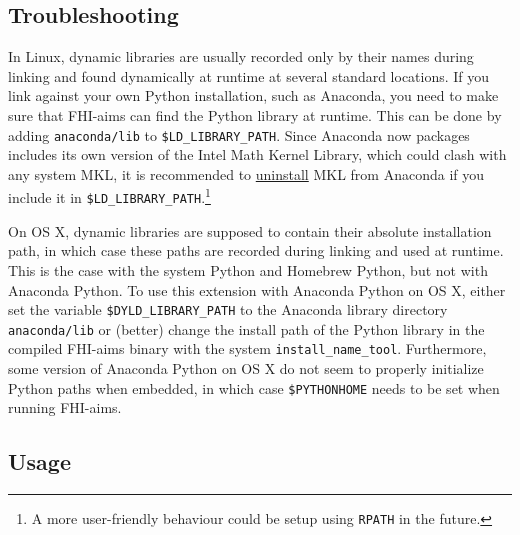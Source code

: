 \subsection*{Troubleshooting}

In Linux, dynamic libraries are usually recorded only by their names during
linking and found dynamically at runtime at several standard locations.
If you
link against your own Python installation, such as Anaconda, you need to make
sure that FHI-aims can find the Python library at runtime.
This can be done by
adding \verb+anaconda/lib+ to \verb+$LD_LIBRARY_PATH+.
Since Anaconda now
packages includes its own version of the Intel Math Kernel Library, which could
clash with any system MKL, it is recommended to
\href{https://docs.continuum.io/mkl-optimizations/index#uninstalling-mkl}{uninstall}
MKL from Anaconda if you include it in \verb+$LD_LIBRARY_PATH+.\footnote{A more
user-friendly behaviour could be setup using \texttt{RPATH} in the future.}

On OS X, dynamic libraries are supposed to contain their absolute installation
path, in which case these paths are recorded during linking and used at
runtime.
This is the case with the system Python and Homebrew Python, but not
with Anaconda Python.
To use this extension with Anaconda Python on OS X,
either set the variable \verb+$DYLD_LIBRARY_PATH+ to the Anaconda library
directory \verb+anaconda/lib+ or (better) change the install path of the Python
library in the compiled FHI-aims binary with the system
\verb+install_name_tool+.
Furthermore, some version of Anaconda Python on OS
X do not seem to properly initialize Python paths when embedded, in which case
\verb+$PYTHONHOME+ needs to be set when running FHI-aims.

\subsection*{Usage}

